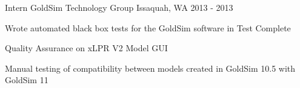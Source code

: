 \begin{cventries}
  \cventry
    {Intern} %
    {GoldSim Technology Group} %
    {Issaquah, WA} %
    {2013 - 2013} %
    {
      \begin{cvitems} %
        \item {Wrote automated black box tests for the GoldSim software in Test Complete}
        \item {Quality Assurance on xLPR V2 Model GUI}
        \item {Manual testing of compatibility between models created in GoldSim 10.5 with GoldSim 11}
      \end{cvitems}
    }

\end{cventries}
